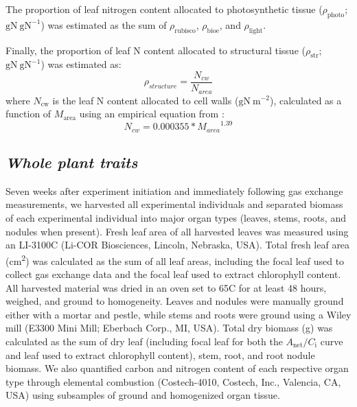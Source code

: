     The proportion of leaf nitrogen content allocated to photosynthetic tissue ($\rho_\mathrm{{photo}}$; $\mathrm{gN\ gN^{-1}}$) was estimated as the sum of $\rho_\mathrm{{rubisco}}$, $\rho_\mathrm{{bioe}}$, and $\rho_\mathrm{{light}}$.

    Finally, the proportion of leaf N content allocated to structural tissue ($\rho_\mathrm{{str}}$; $\mathrm{gN\ gN^{-1}}$) was estimated as:
    \begin{equation} \label{eqn_5.9}
        \rho_{structure}=\frac{N_{cw}}{N_{area}}
    \end{equation}
    \noindent where $N_\mathrm{cw}$ is the leaf N content allocated to cell walls ($\mathrm{gN\ m^{-2}}$), calculated as a function of $M_\mathrm{area}$ using an empirical equation from :
    \begin{equation} \label{eqn_5.10}
        N_{cw}=0.000355*{M_{area}}^{1.39}
    \end{equation}

    \subsection{\textit{Whole plant traits}}

    Seven weeks after experiment initiation and immediately following gas exchange measurements, we harvested all experimental individuals and separated biomass of each experimental individual into major organ types (leaves, stems, roots, and nodules when present). Fresh leaf area of all harvested leaves was measured using an LI-3100C (Li-COR Biosciences, Lincoln, Nebraska, USA). Total fresh leaf area (cm\textsuperscript{2}) was calculated as the sum of all leaf areas, including the focal leaf used to collect gas exchange data and the focal leaf used to extract chlorophyll content. All harvested material was dried in an oven set to 65\textdegree{}C for at least 48 hours, weighed, and ground to homogeneity. Leaves and nodules were manually ground either with a mortar and pestle, while stems and roots were ground using a Wiley mill (E3300 Mini Mill; Eberbach Corp., MI, USA). Total dry biomass (g) was calculated as the sum of dry leaf (including focal leaf for both the $A_\mathrm{{net}}/C_\mathrm{i}$ curve and leaf used to extract chlorophyll content), stem, root, and root nodule biomass. We also quantified carbon and nitrogen content of each respective organ type through elemental combustion (Costech-4010, Costech, Inc., Valencia, CA, USA) using subsamples of ground and homogenized organ tissue.

